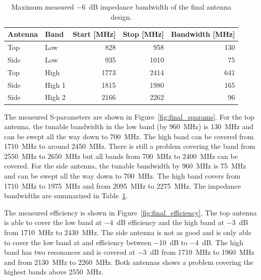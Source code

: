 \begin{table}
    \centering
    \begin{tabular}{|l|l|r|r|r|}
        \hline
        Antenna & Band & Start [MHz] & Stop [MHz] & Bandwidth [MHz] \\
        \hline
        Top & Low & 828 & 958 & 130 \\
        Side & Low & 935 & 1010 & 75 \\
        \hline
        Top & High    & 1773 & 2414 & 641 \\
        Side & High 1 & 1815 & 1980 & 165 \\
        Side & High 2 & 2166 & 2262 &  96 \\
        \hline
    \end{tabular}
    \caption{Maximum measured \SI{-6}{dB} impedance bandwidth of the final antenna design.}
    \label{tab:final_bandwidths}
\end{table}


The measured S-parameters are shown in Figure~\ref{fig:final_sparams}. For the top antenna, the tunable bandwidth in the low band (by \SI{960}{MHz}) is \SI{130}{MHz} and can be swept all the way down to \SI{700}{MHz}. The high band can be covered from \SI{1710}{MHz} to around \SI{2450}{MHz}. There is still a problem covering the band from \SI{2550}{MHz} to \SI{2650}{MHz} but all bands from \SI{700}{MHz} to \SI{2400}{MHz} can be covered. For the side antenna, the tunable bandwidth by \SI{960}{MHz} is \SI{75}{MHz} and can be swept all the way down to \SI{700}{MHz}. The high band covers from \SI{1710}{MHz} to \SI{1975}{MHz} and from \SI{2095}{MHz} to \SI{2275}{MHz}. The impedance bandwidths are summarized in Table~\ref{tab:final_bandwidths}.

The measured efficiency is shown in Figure~\ref{fig:final_efficiency}. The top antenna is able to cover the low band at \SI{-4}{dB} efficiency and the high band at \SI{-3}{dB} from \SI{1710}{MHz} to \SI{2430}{MHz}. The side antenna is not as good and is only able to cover the low band at and efficiency between \SI{-10}{dB} to \SI{-4}{dB}. The high band has two resonances and is covered at \SI{-3}{dB} from \SI{1710}{MHz} to \SI{1960}{MHz} and from \SI{2130}{MHz} to \SI{2260}{MHz}. Both antennas shows a problem covering the highest bands above \SI{2550}{MHz}.

